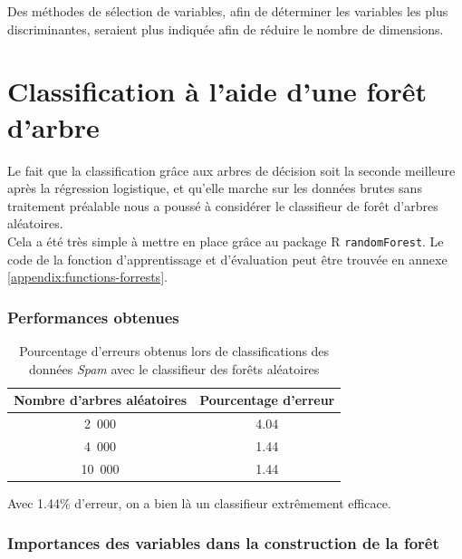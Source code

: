 \documentclass[a4paper,10pt]{report}
\begin{document}
Des méthodes de sélection de variables, afin de déterminer les variables les plus discriminantes, seraient plus indiquée afin de réduire le nombre de dimensions.

\section{Classification à l'aide d'une forêt d'arbre}


Le fait que la classification grâce aux arbres de décision soit la seconde meilleure après la régression logistique, et qu'elle marche sur les données brutes sans traitement préalable nous a poussé à considérer le classifieur de forêt d'arbres aléatoires.\\

Cela a été très simple à mettre en place grâce au package R \texttt{randomForest}. Le code de la fonction d'apprentissage et d'évaluation peut être trouvée en annexe \autoref{appendix:functions-forrests}.

\subsubsection{Performances obtenues}

\begin{table}[H]
	\centering
	\captionsetup{justification=centering, margin=4cm}
	\begin{tabular}{c|c}
		Nombre d'arbres aléatoires & Pourcentage d'erreur  \\ 
		\hline
		2~000 & 4.04 \\ 
		4~000 & 1.44 \\ 
		10~000 & 1.44 \\ 
	\end{tabular}
	\caption{\small Pourcentage d'erreurs obtenus lors de classifications des données \textit{Spam} avec le classifieur des forêts aléatoires}
	\label{table:3-4-Spam-forests-error-rates}
\end{table}


Avec 1.44\% d'erreur, on a bien là un classifieur extrêmement efficace.


\subsubsection{Importances des variables dans la construction de la forêt}
\end{document}

